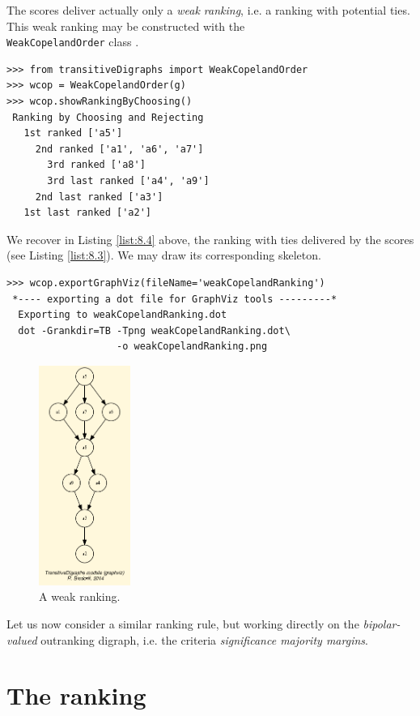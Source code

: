 The \Copeland scores deliver actually only a \emph{weak ranking}, i.e. a ranking with potential ties. This weak ranking may be constructed with the\\
\texttt{WeakCopelandOrder} class .
\begin{lstlisting}[caption={Checking the quality of the \Copeland Ranking},label=list:8.4]
>>> from transitiveDigraphs import WeakCopelandOrder
>>> wcop = WeakCopelandOrder(g)
>>> wcop.showRankingByChoosing()
 Ranking by Choosing and Rejecting
   1st ranked ['a5']
     2nd ranked ['a1', 'a6', 'a7']
       3rd ranked ['a8']
       3rd last ranked ['a4', 'a9']
     2nd last ranked ['a3']
   1st last ranked ['a2']
\end{lstlisting}
We recover in Listing \ref{list:8.4} above, the ranking with ties delivered by the \Copeland scores (see Listing \ref{list:8.3}). We may draw its corresponding skeleton.
\begin{lstlisting}
>>> wcop.exportGraphViz(fileName='weakCopelandRanking')
 *---- exporting a dot file for GraphViz tools ---------*
  Exporting to weakCopelandRanking.dot
  dot -Grankdir=TB -Tpng weakCopelandRanking.dot\
                   -o weakCopelandRanking.png
\end{lstlisting}
\begin{figure}[h]
\sidecaption[t]
\includegraphics[width=3cm]{Figures/weakCopelandRanking.png}
\caption{A weak \Copeland ranking.}
\label{fig:8.2}       %
\end{figure}

Let us now consider a similar ranking rule, but working directly on the \emph{bipolar-valued} outranking digraph, i.e. the criteria \emph{significance majority margins}.

\section{The \NetFlows ranking}
\label{sec:8.3}

